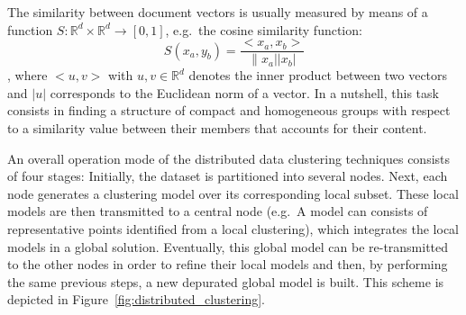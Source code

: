 \documentclass[10pt]{article}
\begin{document}
The similarity between document vectors is usually measured by means of a function $S:\mathbb{R}^d\times \mathbb{R}^d\rightarrow[0,1]$, e.g.\  the cosine similarity function: \[S(x_a,y_b)=\frac{<x_a,x_b>}{\|x_a||x_b|}\], where $<u,v>$ with $u,v\in\mathbb{R}^d$ denotes the inner product between two vectors and $|u|$ corresponds to the Euclidean norm of a vector.
In a nutshell, this task consists in finding a structure of compact and homogeneous groups with respect to a similarity value between their members that accounts for their content. 

An overall operation mode of the distributed data clustering techniques consists of four stages: Initially, the dataset is partitioned into several nodes. Next, each node generates a clustering model over its corresponding local subset. These local models are then transmitted to a central node (e.g.\ A model can consists of representative points identified from a local clustering), which integrates the local models in a global solution. Eventually, this global model can be re-transmitted to the 
other nodes in order to refine their local models and then, by performing the same previous steps, a new depurated 
global model is built. This scheme is depicted in Figure~\ref{fig:distributed_clustering}.
\end{document}
